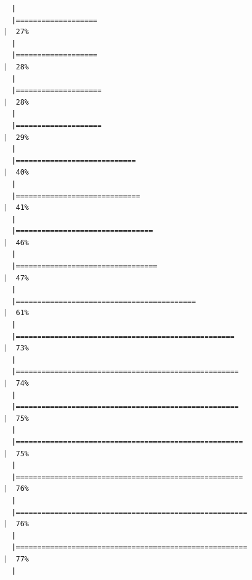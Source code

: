 \documentclass[
  letterpaper,
  DIV=11,
  numbers=noendperiod]{scrreprt}
\begin{document}
\begin{verbatim}
  |                                                                            
  |===================                                                   |  27%
  |                                                                            
  |===================                                                   |  28%
  |                                                                            
  |====================                                                  |  28%
  |                                                                            
  |====================                                                  |  29%
  |                                                                            
  |============================                                          |  40%
  |                                                                            
  |=============================                                         |  41%
  |                                                                            
  |================================                                      |  46%
  |                                                                            
  |=================================                                     |  47%
  |                                                                            
  |==========================================                            |  61%
  |                                                                            
  |===================================================                   |  73%
  |                                                                            
  |====================================================                  |  74%
  |                                                                            
  |====================================================                  |  75%
  |                                                                            
  |=====================================================                 |  75%
  |                                                                            
  |=====================================================                 |  76%
  |                                                                            
  |======================================================                |  76%
  |                                                                            
  |======================================================                |  77%
  |                                                                            

\end{verbatim}
\end{document}
